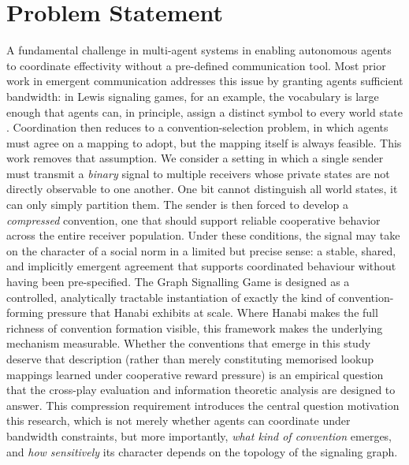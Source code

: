 \documentclass[a4paper,twoside,12pt]{report}
\begin{document}
    \section{Problem Statement}
    A fundamental challenge in multi-agent systems in enabling autonomous agents to coordinate effectivity without a pre-defined communication tool. Most prior work in emergent communication addresses this issue by granting agents sufficient bandwidth: in Lewis signaling  games, for an example, the vocabulary is large enough that agents can, in principle, assign a distinct symbol to every world state \citep{lazaridou2020, skyrms2010}. Coordination then reduces to a convention-selection problem, in which agents must agree on a mapping to adopt, but the mapping itself is always feasible.
    \newline
    This work removes that assumption. We consider a setting in which a single sender must transmit a \emph{binary} signal to multiple receivers whose private states are not directly observable to one another. One bit cannot distinguish all world states, it can only simply partition them. The sender is then forced to develop a \emph{compressed} convention, one that should support reliable cooperative behavior across the entire receiver population. Under these conditions, the signal may take on the character of a social norm in a limited but precise sense: a stable, shared, and implicitly emergent agreement that supports coordinated behaviour without having been pre-specified. The Graph Signalling Game is designed as a
    controlled, analytically tractable instantiation of exactly the kind of
    convention-forming pressure that Hanabi \citep{bard2019} exhibits at
    scale. Where Hanabi makes the full richness of convention formation
    visible, this framework makes the underlying mechanism measurable. Whether the conventions that emerge in this study deserve that description (rather than merely constituting memorised lookup mappings learned under cooperative reward pressure) is an empirical question that the cross-play evaluation and information theoretic analysis are designed to answer.
    \newline
    This compression requirement introduces the central question motivation this research, which is not merely whether agents can coordinate under bandwidth constraints, but more importantly, \emph{what kind of convention} emerges, and \emph{how sensitively} its character depends on the topology of the signaling graph.
    
    
    
\end{document}
